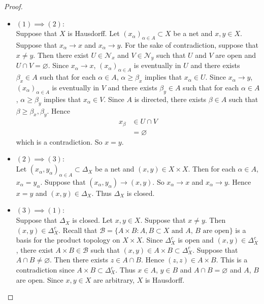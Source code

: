 \documentclass[12pt]{amsart}
\theoremstyle{definition}
\newcommand{\al}{\alpha}
\newcommand{\be}{\beta}
\newcommand{\Del}{\Delta}
\newcommand{\MB}{\mathcal{B}}
\newcommand{\MN}{\mathcal{N}}
\DeclareMathOperator*{\0}{\mbf{0}}
\DeclareMathOperator*{\1}{\mbf{1}}
\begin{document}
	\begin{proof}\
		\begin{itemize}
			\item $(1) \implies (2)$: \\
			Suppose that $X$ is Hausdorff. Let $(x_{\al})_{\al \in A} \subset X$ be a net and $x,y \in X$. Suppose that $x_{\al} \rightarrow x$ and $x_{\al} \rightarrow y$. For the sake of contradiction, suppose that $x \neq y$. Then there exist $U \in \MN_x$ and $V \in \MN_y$ such that $U$ and $V$ are open and $U \cap V = \varnothing$. Since $x_{\al} \rightarrow x$, $(x_{\al})_{\al \in A}$ is eventually in $U$ and there exists $\be_x \in A$ such that for each $\al \in A$, $\al \geq \be_x$ implies that $x_{\al} \in U$. Since $x_{\al} \rightarrow y$, $(x_{\al})_{\al \in A}$ is eventually in $V$ and there exists $\be_y \in A$ such that for each $\al \in A$, $\al \geq \be_y$ implies that $x_{\al} \in V$. Since $A$ is directed, there exists $\be \in A$ such that $\be \geq \be_x, \be_y$. Hence 
			\begin{align*}
				x_{\be} 
				& \in U \cap V \\
				& = \varnothing
			\end{align*}
			which is a contradiction. So $x = y$.
			\item $(2) \implies (3)$: \\
			Let $(x_{\al}, y_{\al})_{\al \in A} \subset \Del_X$ be a net and $(x,y) \in X \times X$. Then for each $\al \in A$, $x_{\al} = y_{\al}$. Suppose that $(x_{\al}, y_{\al}) \rightarrow (x,y)$. So $x_{\al} \rightarrow x$ and $x_{\al} \rightarrow y$. Hence $x = y$ and $(x,y) \in \Del_X$. Thus $\Del_X$ is closed.
			\item $(3) \implies (1)$: \\
			Suppose that $\Del_X$ is closed. Let $x,y \in X$. Suppose that $x \neq y$. Then $(x,y) \in \Del_X^c$. Recall that $\MB = \{A \times B: A,B \subset X \text{ and $A$, $B$ are open}\}$ is a basis for the product topology on $X \times X$. Since $\Del_X^c$ is open and $(x,y) \in \Del_X^c$, there exist $A \times B \in \MB$ such that $(x,y) \in A \times B \subset \Del_X^c$. Suppose that $A \cap B \neq \varnothing$. Then there exists $z \in A \cap B$. Hence $(z,z) \in A \times B$. This is a contradiction since $A  \times B \subset \Del_X^c$. Thus $x \in A$, $y \in B$ and $A \cap B = \varnothing$ and $A$, $B$ are open. Since $x,y \in X$ are arbitrary, $X$ is Hausdorff. 
		\end{itemize}
	\end{proof}
	
\end{document}
